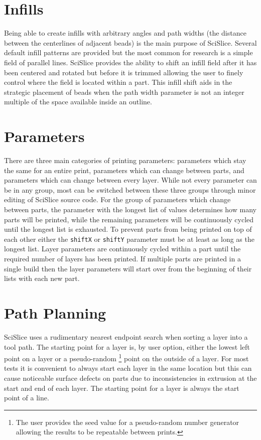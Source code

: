 \documentclass[main.tex]{subfiles}
\begin{document}
\section{Infills}
Being able to create infills with arbitrary angles and path widths (the distance between the centerlines of adjacent beads) is the main purpose of SciSlice.
Several default infill patterns are provided but the most common for research is a simple field of parallel lines.
SciSlice provides the ability to shift an infill field after it has been centered and rotated but before it is trimmed allowing the user to finely control where the field is located within a part.
This infill shift aids in the strategic placement of beads when the path width parameter is not an integer multiple of the space available inside an outline.

\section{Parameters}
There are three main categories of printing parameters: parameters which stay the same for an entire print, parameters which can change between parts, and parameters which can change between every layer.
While not every parameter can be in any group, most can be switched between these three groups through minor editing of SciSlice source code.
For the group of parameters which change between parts, the parameter with the longest list of values determines how many parts will be printed, while the remaining parameters will be continuously cycled until the longest list is exhausted.
To prevent parts from being printed on top of each other either the \texttt{shiftX} or \texttt{shiftY} parameter must be at least as long as the longest list.
Layer parameters are continuously cycled within a part until the required number of layers has been printed.
If multiple parts are printed in a single build then the layer parameters will start over from the beginning of their lists with each new part.

\section{Path Planning}
SciSlice uses a rudimentary nearest endpoint search when sorting a layer into a tool path.
The starting point for a layer is, by user option, either the lowest left point on a layer or a pseudo-random%
\footnote{The user provides the seed value for a pseudo-random number generator allowing the results to be repeatable between prints.}
point on the outside of a layer.
For most tests it is convenient to always start each layer in the same location but this can cause noticeable surface defects on parts due to inconsistencies in extrusion at the start and end of each layer.
The starting point for a layer is always the start point of a line.
\end{document}
